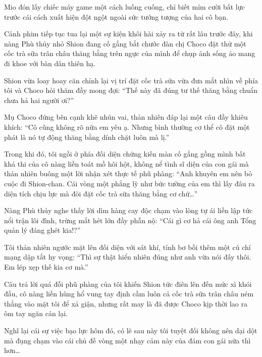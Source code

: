 \documentclass[../main.tex]{subfiles}
\begin{document}
Mio đón lấy chiếc máy game một cách luống cuống, chỉ biết mỉm cười bất lực trước cái cách xuất hiện đột ngột ngoài sức tưởng tượng của hai cô bạn.


\il


Cảnh phim tiếp tục tua lại một sự kiện khôi hài xảy ra từ rất lâu trước đây, khi nàng Phù thủy nhỏ Shion đang cố gắng bắt chước đàn chị Choco đặt thử một cốc trà sữa trân châu thăng bằng trên ngực của mình để chụp ảnh sống ảo mang đi khoe với bàn dân thiên hạ.

Shion vừa loay hoay căn chỉnh lại vị trí đặt cốc trà sữa vừa đưa mắt nhìn về phía tôi và Choco hỏi thăm đầy mong đợi: ``Thế này đã đúng tư thế thăng bằng chuẩn chưa hả hai người ơi?''

Mụ Choco đứng bên cạnh khẽ nhún vai, thản nhiên đáp lại một câu đầy khiêu khích: ``Cô cũng không rõ nữa em yêu ạ. Nhưng bình thường cơ thể cô đặt một phát là nó tự động thăng bằng dính chặt luôn mà lị.''

Trong khi đó, tôi ngồi ở phía đối diện chứng kiến màn cố gắng gồng mình bất khả thi của cô nàng liền toát mồ hôi hột, không nể tình sĩ diện của con gái mà thản nhiên buông một lời nhận xét thực tế phũ phàng: ``Anh khuyên em nên bỏ cuộc đi Shion-chan. Cái vòng một phẳng lỳ như bức tường của em thì lấy đâu ra diện tích chịu lực mà đòi đặt cốc trà sữa thăng bằng cơ chứ\dots''

Nàng Phù thủy nghe thấy lời dìm hàng cay độc chạm vào lòng tự ái liền lập tức nổi trận lôi đình, trừng mắt hét lớn đầy phẫn nộ: ``Cái gì cơ hả cái ông anh Tổng quản lý đáng ghét kia!?''

Tôi thản nhiên ngước mặt lên đối diện với sát khí, tỉnh bơ bồi thêm một cú chí mạng dập tắt hy vọng: ``Thì sự thật hiển nhiên đúng như anh vừa nói đấy thôi. Em lép xẹp thế kia cơ mà.''

Câu trả lời quá đỗi phũ phàng của tôi khiến Shion tức điên lên đến mức xì khói đầu, cô nàng liền hùng hổ vung tay định cầm luôn cả cốc trà sữa trân châu ném thẳng vào mặt tôi để xả giận, nhưng rất may là đã được Choco kịp thời lao ra ôm tay ngăn cản lại.

Nghĩ lại cái sự việc bạo lực hôm đó, có lẽ sau này tôi tuyệt đối không nên dại dột mà đụng chạm vào cái chủ đề vòng một nhạy cảm này của đám con gái nữa thì hơn\dots


\il

\end{document}
